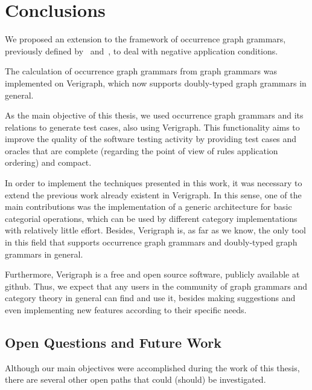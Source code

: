 \chapter{Conclusions}\label{ch:conclusions}

  We proposed an extension to the framework of occurrence graph grammars, previously defined by~\cite{Ribeiro1996} and~\cite{Corradini1996},  to deal with negative application conditions.

  The calculation of occurrence graph grammars from graph grammars was implemented on Verigraph, which now supports doubly-typed graph grammars in general.

  As the main objective of this thesis, we used occurrence graph grammars and its relations to generate test cases, also using Verigraph. This functionality aims to improve the quality of the software testing activity by providing test cases and oracles that are complete (regarding the point of view of rules application ordering) and compact.

  In order to implement the techniques presented in this work, it was necessary to extend the previous work already existent in Verigraph. In this sense, one of the main contributions was the implementation of a generic architecture for basic categorial operations, which can be used by different category implementations with relatively little effort. Besides, Verigraph is, as far as we know, the only tool in this field that supports occurrence graph grammars and doubly-typed graph grammars in general.

    Furthermore, Verigraph is a free and open source software, publicly available at github. Thus, we expect that any users in the community of graph grammars and category theory in general can find and use it, besides making suggestions and even implementing new features according to their specific needs.

\section{Open Questions and Future Work}

Although our main objectives were accomplished during the work of this thesis, there are several other open paths that could (should) be investigated. 


